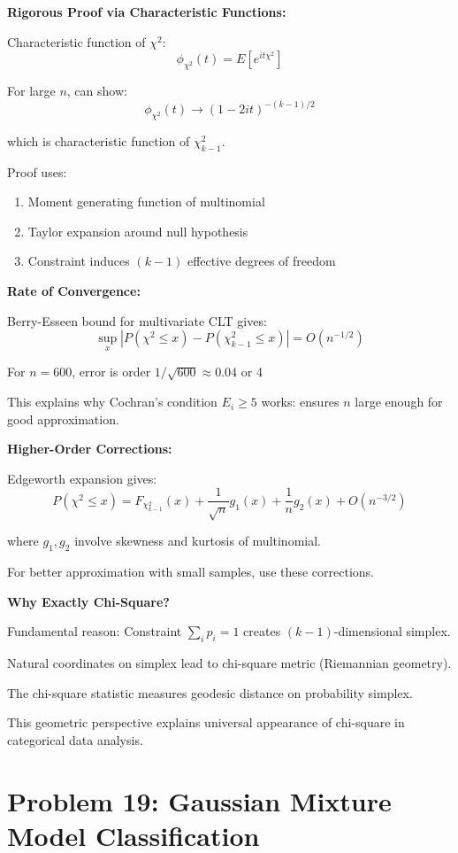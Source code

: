 \documentclass[12pt]{article}
\begin{document}
\begin{explanation}
\textbf{Rigorous Proof via Characteristic Functions:}

Characteristic function of $\chi^2$:
\[
\phi_{\chi^2}(t) = E[e^{it\chi^2}]
\]

For large $n$, can show:
\[
\phi_{\chi^2}(t) \to (1 - 2it)^{-(k-1)/2}
\]

which is characteristic function of $\chi^2_{k-1}$.

Proof uses:
\begin{enumerate}
    \item Moment generating function of multinomial
    \item Taylor expansion around null hypothesis
    \item Constraint induces $(k-1)$ effective degrees of freedom
\end{enumerate}

\textbf{Rate of Convergence:}

Berry-Esseen bound for multivariate CLT gives:
\[
\sup_x |P(\chi^2 \leq x) - P(\chi^2_{k-1} \leq x)| = O(n^{-1/2})
\]

For $n = 600$, error is order $1/\sqrt{600} \approx 0.04$ or 4%

This explains why Cochran's condition $E_i \geq 5$ works: ensures $n$ large enough for good approximation.

\textbf{Higher-Order Corrections:}

Edgeworth expansion gives:
\[
P(\chi^2 \leq x) = F_{\chi^2_{k-1}}(x) + \frac{1}{\sqrt{n}}g_1(x) + \frac{1}{n}g_2(x) + O(n^{-3/2})
\]

where $g_1, g_2$ involve skewness and kurtosis of multinomial.

For better approximation with small samples, use these corrections.

\textbf{Why Exactly Chi-Square?}

Fundamental reason: Constraint $\sum_i p_i = 1$ creates $(k-1)$-dimensional simplex.

Natural coordinates on simplex lead to chi-square metric (Riemannian geometry).

The chi-square statistic measures geodesic distance on probability simplex.

This geometric perspective explains universal appearance of chi-square in categorical data analysis.

\end{explanation}

\newpage
\section{Problem 19: Gaussian Mixture Model Classification}
\end{document}
